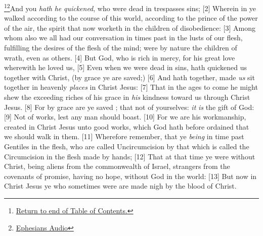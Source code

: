 \footnote{\textcolor[cmyk]{0.99998,1,0,0}{\hyperlink{TOC}{Return to end of Table of Contents.}}}\footnote{\href{https://www.audioverse.org/english/audiobibles/books/ENGKJV/N/Eph/1}{\textcolor[cmyk]{0.99998,1,0,0}{Ephesians Audio}}}\textcolor[cmyk]{0.99998,1,0,0}{And you \emph{hath} \emph{he} \emph{quickened}, who were dead in trespasses  sins;}
[2] \textcolor[cmyk]{0.99998,1,0,0}{Wherein in  ye walked according to the course of this world, according to the prince of the power of the air, the spirit that now worketh in the children of disobedience:}
[3] \textcolor[cmyk]{0.99998,1,0,0}{Among whom also we all had our conversation in times past in the lusts of our flesh, fulfilling the desires of the flesh  of the mind;  were by nature the children of wrath, even as others.}
[4] \textcolor[cmyk]{0.99998,1,0,0}{But God, who is rich in mercy, for his great love wherewith he loved us,}
[5] \textcolor[cmyk]{0.99998,1,0,0}{Even when we were dead in sins, hath quickened us together with Christ, (by grace ye are saved;)}
[6] \textcolor[cmyk]{0.99998,1,0,0}{And hath  together,  made \emph{us} sit together in heavenly \emph{places} in Christ Jesus:}
[7] \textcolor[cmyk]{0.99998,1,0,0}{That in the ages to come he might shew the exceeding riches of his grace in \emph{his} kindness toward us through Christ Jesus.}
[8] \textcolor[cmyk]{0.99998,1,0,0}{For by grace are ye saved ;  that not of yourselves: \emph{it} \emph{is} the gift of God:}
[9] \textcolor[cmyk]{0.99998,1,0,0}{Not of works, lest any man should boast.}
[10] \textcolor[cmyk]{0.99998,1,0,0}{For we are his workmanship, created in Christ Jesus unto good works, which God hath before ordained that we should walk in them.}
[11] \textcolor[cmyk]{0.99998,1,0,0}{Wherefore remember, that ye \emph{being} in time past Gentiles in the flesh, who are called Uncircumcision by that which is called the Circumcision in the flesh made by hands;}
[12] \textcolor[cmyk]{0.99998,1,0,0}{That at that time ye were without Christ, being aliens from the commonwealth of Israel,  strangers from the covenants of promise, having no hope,  without God in the world:}
[13] \textcolor[cmyk]{0.99998,1,0,0}{But now in Christ Jesus ye who sometimes were  are made nigh by the blood of Christ.}
